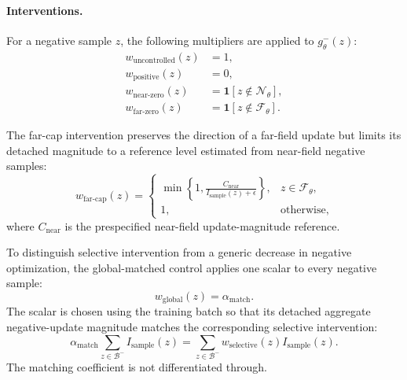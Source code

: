 \documentclass{article}
\theoremstyle{plain}
\theoremstyle{definition}
\theoremstyle{remark}
\begin{document}
\paragraph{Interventions.}
For a negative sample $z$, the following multipliers are applied to
$g_\theta^-(z)$:
\begin{equation}
\begin{aligned}
    w_{\mathrm{uncontrolled}}(z)
    &=1,\\
    w_{\mathrm{positive}}(z)
    &=0,\\
    w_{\mathrm{near\text{-}zero}}(z)
    &=
    \mathbf 1[z\notin\mathcal N_\theta],\\
    w_{\mathrm{far\text{-}zero}}(z)
    &=
    \mathbf 1[z\notin\mathcal F_\theta].
\end{aligned}
\label{eq:causal_zero_interventions}
\end{equation}

The far-cap intervention preserves the direction of a far-field update
but limits its detached magnitude to a reference level estimated from
near-field negative samples:
\begin{equation}
    w_{\mathrm{far\text{-}cap}}(z)
    =
    \begin{cases}
        \displaystyle
        \min\left\{
            1,
            \frac{C_{\mathrm{near}}}
                 {I_{\mathrm{sample}}(z)+\epsilon}
        \right\},
        & z\in\mathcal F_\theta,\\[3mm]
        1,
        & \text{otherwise},
    \end{cases}
    \label{eq:causal_far_cap}
\end{equation}
where $C_{\mathrm{near}}$ is the prespecified near-field update-magnitude
reference.

To distinguish selective intervention from a generic decrease in
negative optimization, the global-matched control applies one scalar
to every negative sample:
\begin{equation}
    w_{\mathrm{global}}(z)
    =
    \alpha_{\mathrm{match}}.
    \label{eq:causal_global_weight}
\end{equation}
The scalar is chosen using the training batch so that its detached aggregate
negative-update magnitude matches the corresponding selective
intervention:
\begin{equation}
    \alpha_{\mathrm{match}}
    \sum_{z\in\mathcal B^-}
        I_{\mathrm{sample}}(z)
    =
    \sum_{z\in\mathcal B^-}
        w_{\mathrm{selective}}(z)
        I_{\mathrm{sample}}(z).
    \label{eq:causal_budget_match}
\end{equation}
The matching coefficient is not differentiated through.
\end{document}
